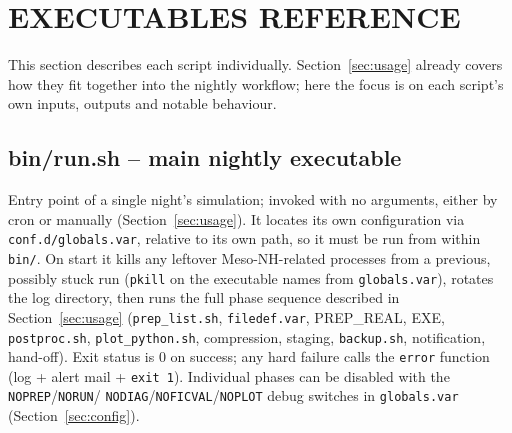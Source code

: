\section{EXECUTABLES REFERENCE}
\label{sec:executables}
This section describes each script individually. Section~\ref{sec:usage} already covers how they fit
together into the nightly workflow; here the focus is on each script's own inputs, outputs and notable
behaviour.

\subsection{bin/run.sh -- main nightly executable}
Entry point of a single night's simulation; invoked with no arguments, either by cron or manually
(Section~\ref{sec:usage}). It locates its own configuration via \texttt{conf.d/globals.var}, relative to
its own path, so it must be run from within \texttt{bin/}. On start it kills any leftover Meso-NH-related
processes from a previous, possibly stuck run (\texttt{pkill} on the executable names from
\texttt{globals.var}), rotates the log directory, then runs the full phase sequence described in
Section~\ref{sec:usage} (\texttt{prep\_list.sh}, \texttt{filedef.var}, PREP\_REAL, EXE,
\texttt{postproc.sh}, \texttt{plot\_python.sh}, compression, staging, \texttt{backup.sh}, notification,
hand-off). Exit status is 0 on success; any hard failure calls the \texttt{error} function (log + alert
mail + \texttt{exit 1}). Individual phases can be disabled with the \texttt{NOPREP}\slash\texttt{NORUN}\slash
\texttt{NODIAG}\slash\texttt{NOFICVAL}\slash\texttt{NOPLOT} debug switches in \texttt{globals.var}
(Section~\ref{sec:config}).

